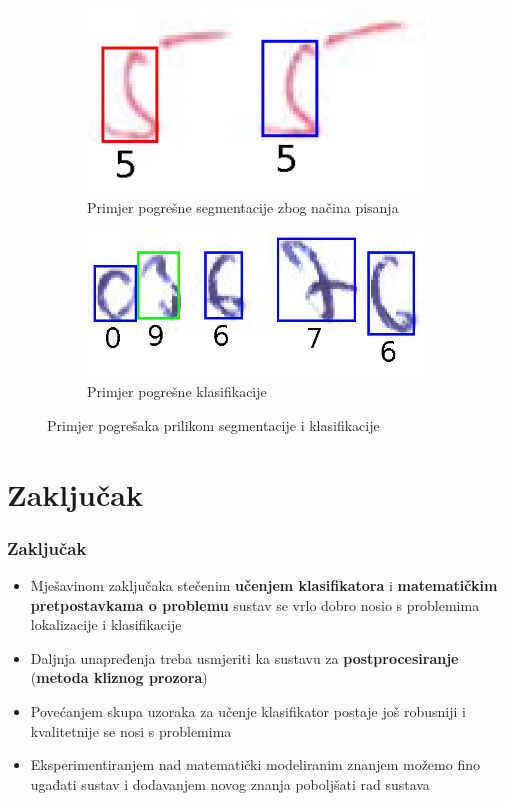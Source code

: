 \documentclass{beamer}
\begin{document}
\begin{frame}
\begin{figure}
		\begin{subfigure}[t]{.4\textwidth}
			\centering
			\includegraphics[width=\linewidth]{error_3.png}
			\caption{Primjer pogrešne segmentacije zbog načina pisanja}
			\label{error3}
		\end{subfigure}
		\hfill
		\begin{subfigure}[t]{.4\textwidth}
			\centering
			\includegraphics[width=\linewidth]{error_4.png}
			\caption{Primjer pogrešne klasifikacije}
			\label{error4}
		\end{subfigure}
		\caption{Primjer pogrešaka prilikom segmentacije i klasifikacije}
	\end{figure}
\end{frame}

\section{Zaključak}
\begin{frame}
	\frametitle{Zaključak}
	\begin{itemize}
		\item Mješavinom zaključaka stečenim \textbf{učenjem klasifikatora} i \textbf{matematičkim pretpostavkama o problemu} sustav se vrlo dobro nosio s problemima lokalizacije i klasifikacije
		\item Daljnja unapređenja treba usmjeriti ka sustavu za \textbf{postprocesiranje} (\textbf{metoda kliznog prozora})
		\item Povećanjem skupa uzoraka za učenje klasifikator postaje još robusniji i kvalitetnije se nosi s problemima
		\item Eksperimentiranjem nad matematički modeliranim znanjem možemo fino ugađati sustav i dodavanjem novog znanja poboljšati rad sustava
		\end{itemize}
	\end{frame}
\end{document}
